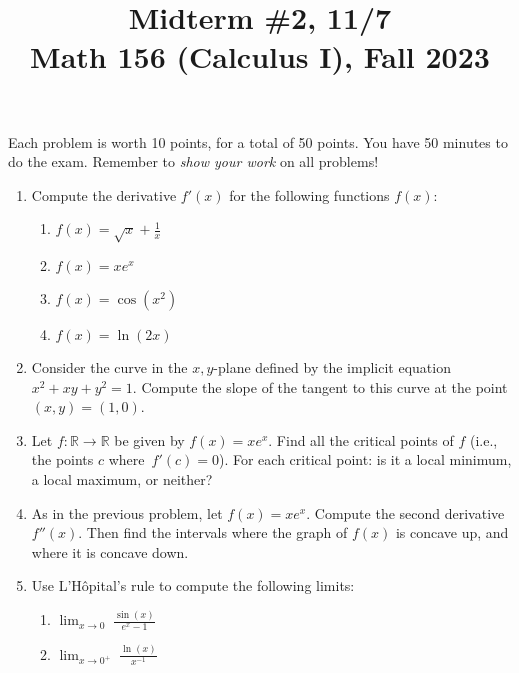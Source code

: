 \documentclass[11pt]{article}
\title{Midterm \#2, 11/7 \\ Math 156 (Calculus I), Fall 2023}
\date{}
\begin{document}
\maketitle

\thispagestyle{empty}

\vspace{-1cm}

Each problem is worth 10 points, for a total of 50 points. You have 50 minutes to do the exam. Remember to \emph{show your work} on all problems!

\begin{enumerate}
\item Compute the derivative $f'(x)$ for the following functions $f(x)$:
\begin{enumerate}
\item $f(x) = \sqrt{x} + \frac{1}{x}$
\item $f(x) = x e^{x}$
\item $f(x) = \cos(x^2)$
\item $f(x) = \ln(2x)$
\end{enumerate}

\item Consider the curve in the $x,y$-plane defined by the implicit equation $x^2 + xy + y^2 = 1$. Compute the slope of the tangent to this curve at the point $(x,y) = (1,0)$.

\item Let $f\colon \mathbb{R}\to \mathbb{R}$ be given by $f(x) = x e^{x}$. Find all the critical points of $f$ (i.e., the points $c$ where~$f'(c)=0$). For each critical point: is it a local minimum, a local maximum, or neither?

\item As in the previous problem, let $f(x) = x e^{x}$. Compute the second derivative $f''(x)$. Then find the intervals where the graph of $f(x)$ is concave up, and where it is concave down.

\item Use L'H\^{o}pital's rule to compute the following limits:
\begin{enumerate}
\item $\displaystyle \lim_{x \to 0} \; \frac{\sin(x)}{e^x - 1}$ \\[0.25em]
\item $\displaystyle \lim_{x \to 0^+} \; \frac{\ln(x)}{x^{-1}}$
\end{enumerate}
\end{enumerate}
\end{document}
